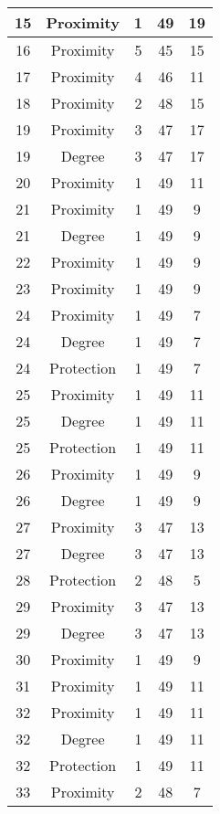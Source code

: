 \documentclass[results.tex]{subfiles}
\begin{document}
\begin{center}
\begin{tabular}{| c || c | c | c | c |}
    15 & Proximity & 1 & 49 & 19 \\ 
    \hline
    16 & Proximity & 5 & 45 & 15 \\ 
    \hline
    17 & Proximity & 4 & 46 & 11 \\ 
    \hline
    18 & Proximity & 2 & 48 & 15 \\ 
    \hline
    19 & Proximity & 3 & 47 & 17 \\ 
    \hline
    19 & Degree & 3 & 47 & 17 \\ 
    \hline
    20 & Proximity & 1 & 49 & 11 \\ 
    \hline
    21 & Proximity & 1 & 49 & 9 \\ 
    \hline
    21 & Degree & 1 & 49 & 9 \\ 
    \hline
    22 & Proximity & 1 & 49 & 9 \\ 
    \hline
    23 & Proximity & 1 & 49 & 9 \\ 
    \hline
    24 & Proximity & 1 & 49 & 7 \\ 
    \hline
    24 & Degree & 1 & 49 & 7 \\ 
    \hline
    24 & Protection & 1 & 49 & 7 \\ 
    \hline
    25 & Proximity & 1 & 49 & 11 \\ 
    \hline
    25 & Degree & 1 & 49 & 11 \\ 
    \hline
    25 & Protection & 1 & 49 & 11 \\ 
    \hline
    26 & Proximity & 1 & 49 & 9 \\ 
    \hline
    26 & Degree & 1 & 49 & 9 \\ 
    \hline
    27 & Proximity & 3 & 47 & 13 \\ 
    \hline
    27 & Degree & 3 & 47 & 13 \\ 
    \hline
    28 & Protection & 2 & 48 & 5 \\ 
    \hline
    29 & Proximity & 3 & 47 & 13 \\ 
    \hline
    29 & Degree & 3 & 47 & 13 \\ 
    \hline
    30 & Proximity & 1 & 49 & 9 \\ 
    \hline
    31 & Proximity & 1 & 49 & 11 \\ 
    \hline
    32 & Proximity & 1 & 49 & 11 \\ 
    \hline
    32 & Degree & 1 & 49 & 11 \\ 
    \hline
    32 & Protection & 1 & 49 & 11 \\ 
    \hline
    33 & Proximity & 2 & 48 & 7 \\ 
    \hline

\end{tabular}
\end{center}
\end{document}

